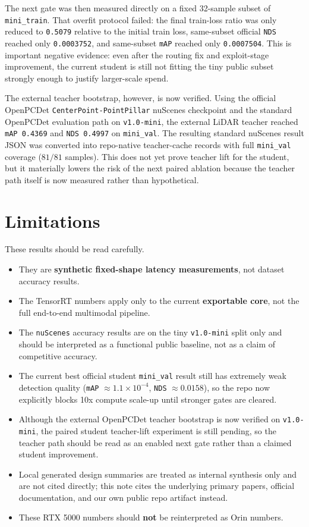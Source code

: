 \documentclass[11pt]{article}
\begin{document}
The next gate was then measured directly on a fixed 32-sample subset of \texttt{mini\_train}. That overfit protocol failed: the final train-loss ratio was only reduced to \texttt{0.5079} relative to the initial train loss, same-subset official \texttt{NDS} reached only \texttt{0.0003752}, and same-subset \texttt{mAP} reached only \texttt{0.0007504}. This is important negative evidence: even after the routing fix and exploit-stage improvement, the current student is still not fitting the tiny public subset strongly enough to justify larger-scale spend.

The external teacher bootstrap, however, is now verified. Using the official OpenPCDet \texttt{CenterPoint-PointPillar} nuScenes checkpoint and the standard OpenPCDet evaluation path on \texttt{v1.0-mini}, the external LiDAR teacher reached \texttt{mAP 0.4369} and \texttt{NDS 0.4997} on \texttt{mini\_val}. The resulting standard nuScenes result JSON was converted into repo-native teacher-cache records with full \texttt{mini\_val} coverage (\(81/81\) samples). This does not yet prove teacher lift for the student, but it materially lowers the risk of the next paired ablation because the teacher path itself is now measured rather than hypothetical.

\section{Limitations}
These results should be read carefully.
\begin{itemize}
\item They are \textbf{synthetic fixed-shape latency measurements}, not dataset accuracy results.
\item The TensorRT numbers apply only to the current \textbf{exportable core}, not the full end-to-end multimodal pipeline.
\item The \texttt{nuScenes} accuracy results are on the tiny \texttt{v1.0-mini} split only and should be interpreted as a functional public baseline, not as a claim of competitive accuracy.
\item The current best official student \texttt{mini\_val} result still has extremely weak detection quality (\texttt{mAP} \(\approx 1.1 \times 10^{-4}\), \texttt{NDS} \(\approx 0.0158\)), so the repo now explicitly blocks 10x compute scale-up until stronger gates are cleared.
\item Although the external OpenPCDet teacher bootstrap is now verified on \texttt{v1.0-mini}, the paired student teacher-lift experiment is still pending, so the teacher path should be read as an enabled next gate rather than a claimed student improvement.
\item Local generated design summaries are treated as internal synthesis only and are not cited directly; this note cites the underlying primary papers, official documentation, and our own public repo artifact instead.
\item These RTX 5000 numbers should \textbf{not} be reinterpreted as Orin numbers.
\end{itemize}
\end{document}

